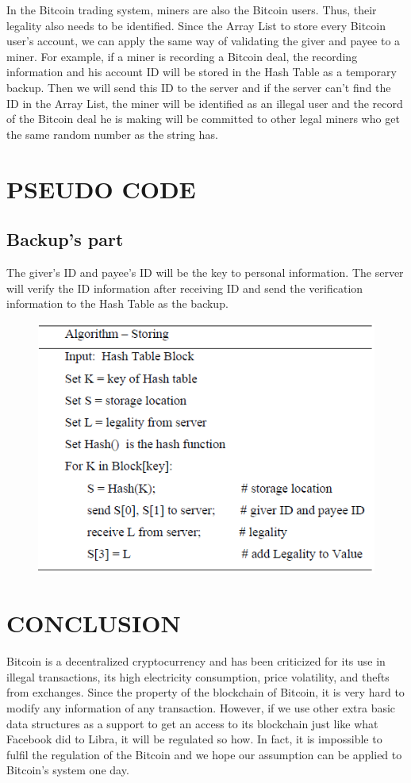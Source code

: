 \documentclass[conference]{IEEEtran}
\begin{document}
In the Bitcoin trading system, miners are also the Bitcoin users. Thus, their legality also needs to be identified. Since the Array List to store every Bitcoin user’s account, we can apply the same way of validating the giver and payee to a miner. For example, if a miner is recording a Bitcoin deal, the recording information and his account ID will be stored in the Hash Table as a temporary backup. Then we will send this ID to the server and if the server can’t find the ID in the Array List, the miner will be identified as an illegal user and the record of the Bitcoin deal he is making will be committed to other legal miners who get the same random number as the string has.

\section{PSEUDO CODE}
\subsection{Backup’s part}
The giver’s ID and payee’s ID will be the key to personal information. The server will verify the ID information after receiving ID and send the verification information to the Hash Table as the backup.
\begin{figure}[ht]	
	\centering
	\includegraphics[scale=0.4]{ALG_B.png}
\end{figure}

\section{CONCLUSION}
Bitcoin is a decentralized cryptocurrency and has been criticized for its use in illegal transactions, its high electricity consumption, price volatility, and thefts from exchanges. Since the property of the blockchain of Bitcoin, it is very hard to modify any information of any transaction. However, if we use other extra basic data structures as a support to get an access to its blockchain just like what Facebook did to Libra, it will be regulated so how. In fact, it is impossible to fulfil the regulation of the Bitcoin and we hope our assumption can be applied to Bitcoin’s system one day.
\end{document}

